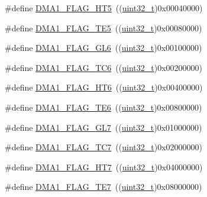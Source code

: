 \begin{DoxyCompactItemize}
\item 
\#define \hyperlink{group___d_m_a__flags__definition_ga648a2eb0b008ab009f03d207596c3cd7}{D\+M\+A1\+\_\+\+F\+L\+A\+G\+\_\+\+H\+T5}~((\hyperlink{_p_e___types_8h_a33594304e786b158f3fb30289278f5af}{uint32\+\_\+t})0x00040000)
\item 
\#define \hyperlink{group___d_m_a__flags__definition_ga17b9793d2f78c683f7c48ba4f7fa2e70}{D\+M\+A1\+\_\+\+F\+L\+A\+G\+\_\+\+T\+E5}~((\hyperlink{_p_e___types_8h_a33594304e786b158f3fb30289278f5af}{uint32\+\_\+t})0x00080000)
\item 
\#define \hyperlink{group___d_m_a__flags__definition_gab21d0196f89435f61bedd03d53edc093}{D\+M\+A1\+\_\+\+F\+L\+A\+G\+\_\+\+G\+L6}~((\hyperlink{_p_e___types_8h_a33594304e786b158f3fb30289278f5af}{uint32\+\_\+t})0x00100000)
\item 
\#define \hyperlink{group___d_m_a__flags__definition_ga85276600ddf436d4f268199e0df9c54a}{D\+M\+A1\+\_\+\+F\+L\+A\+G\+\_\+\+T\+C6}~((\hyperlink{_p_e___types_8h_a33594304e786b158f3fb30289278f5af}{uint32\+\_\+t})0x00200000)
\item 
\#define \hyperlink{group___d_m_a__flags__definition_ga0d594cb12f86f19c9562d82c3ca505bc}{D\+M\+A1\+\_\+\+F\+L\+A\+G\+\_\+\+H\+T6}~((\hyperlink{_p_e___types_8h_a33594304e786b158f3fb30289278f5af}{uint32\+\_\+t})0x00400000)
\item 
\#define \hyperlink{group___d_m_a__flags__definition_ga231e156a0e27f7b2271ea44ca90c237d}{D\+M\+A1\+\_\+\+F\+L\+A\+G\+\_\+\+T\+E6}~((\hyperlink{_p_e___types_8h_a33594304e786b158f3fb30289278f5af}{uint32\+\_\+t})0x00800000)
\item 
\#define \hyperlink{group___d_m_a__flags__definition_ga37e5e27ca5bf6f3211d2effda2ca7646}{D\+M\+A1\+\_\+\+F\+L\+A\+G\+\_\+\+G\+L7}~((\hyperlink{_p_e___types_8h_a33594304e786b158f3fb30289278f5af}{uint32\+\_\+t})0x01000000)
\item 
\#define \hyperlink{group___d_m_a__flags__definition_ga327907756920f193d5d57d8cca845ad6}{D\+M\+A1\+\_\+\+F\+L\+A\+G\+\_\+\+T\+C7}~((\hyperlink{_p_e___types_8h_a33594304e786b158f3fb30289278f5af}{uint32\+\_\+t})0x02000000)
\item 
\#define \hyperlink{group___d_m_a__flags__definition_ga1a7cbf9dffa4fc5ef1cedb46ea446387}{D\+M\+A1\+\_\+\+F\+L\+A\+G\+\_\+\+H\+T7}~((\hyperlink{_p_e___types_8h_a33594304e786b158f3fb30289278f5af}{uint32\+\_\+t})0x04000000)
\item 
\#define \hyperlink{group___d_m_a__flags__definition_ga8b967e41e2d2dcc6d638a664f8e0900c}{D\+M\+A1\+\_\+\+F\+L\+A\+G\+\_\+\+T\+E7}~((\hyperlink{_p_e___types_8h_a33594304e786b158f3fb30289278f5af}{uint32\+\_\+t})0x08000000)

\end{DoxyCompactItemize}
